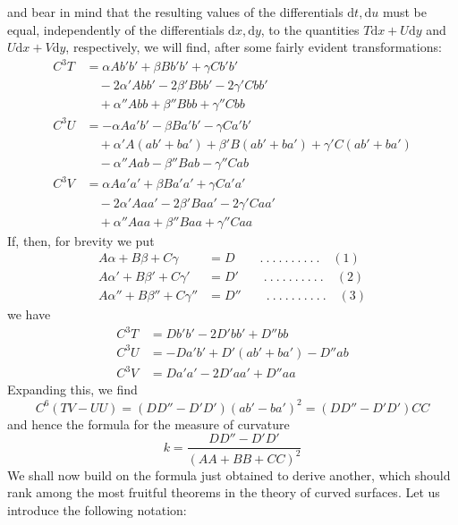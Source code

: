 %
and bear in mind that the resulting values of the differentials \(\mathrm{d}t,\mathrm{d}u\) must be equal, independently of the differentials \(\mathrm{d}x,\mathrm{d}y\), to the quantities \(T\mathrm{d}x+U\mathrm{d}y\) and \(U\mathrm{d}x+V\mathrm{d}y\), respectively, we will find, after some fairly evident transformations:
\[
\begin{aligned}
C^3T&=\alpha Ab'b'+\beta Bb'b'+\gamma Cb'b'\\
&\quad-2\alpha'Abb'-2\beta'Bbb'-2\gamma'Cbb'\\
&\quad+\alpha''Abb+\beta''Bbb+\gamma''Cbb\\
C^3U&=-\alpha Aa'b'-\beta Ba'b'-\gamma Ca'b'\\
&\quad+\alpha'A(ab'+ba')+\beta'B(ab'+ba')+\gamma'C(ab'+ba')\\
&\quad-\alpha''Aab-\beta''Bab-\gamma''Cab\\
C^3V&=\alpha Aa'a'+\beta Ba'a'+\gamma Ca'a'\\
&\quad-2\alpha'Aaa'-2\beta'Baa'-2\gamma'Caa'\\
&\quad+\alpha''Aaa+\beta''Baa+\gamma''Caa
\end{aligned}
\]
If, then, for brevity we put
\[
\begin{aligned}
A\alpha+B\beta+C\gamma&=D\qquad .\ .\ .\ .\ .\ .\ .\ .\ .\ .\quad(1)\\
A\alpha'+B\beta'+C\gamma'&=D'\qquad .\ .\ .\ .\ .\ .\ .\ .\ .\ .\quad(2)\\
A\alpha''+B\beta''+C\gamma''&=D''\qquad .\ .\ .\ .\ .\ .\ .\ .\ .\ .\quad(3)
\end{aligned}
\]
we have
\[
\begin{aligned}
C^3T&=Db'b'-2D'bb'+D''bb\\
C^3U&=-Da'b'+D'(ab'+ba')-D''ab\\
C^3V&=Da'a'-2D'aa'+D''aa
\end{aligned}
\]
Expanding this, we find
\[
C^6(TV-UU)=(DD''-D'D')(ab'-ba')^2=(DD''-D'D')CC
\]
and hence the formula for the measure of curvature
\[
k=\frac{DD''-D'D'}{(AA+BB+CC)^2}
\]
We shall now build on the formula just obtained to derive another, which should rank among the most fruitful theorems in the theory of curved surfaces. Let us introduce the following notation:
